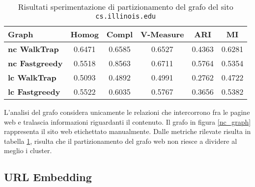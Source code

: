 \begin{table}[H]
	\begin{tabular}{| l | c | c | c | c | c |}
	\hline
	\textbf{Graph}  & \textbf{Homog} & \textbf{Compl} & \textbf{V-Measure}  & \textbf{ARI}  & \textbf{MI} \\ [3ex] \hline
	\textbf{nc WalkTrap} & 0.6471 & 0.6585 & 0.6527 & 0.4363 & 0.6281\\ [3ex]
	 \hline
	\textbf{nc Fastgreedy} & 0.5518 & 0.8563 & 0.6711 & 0.5764 & 0.5354\\ [3ex]
	 \hline	
	\textbf{lc WalkTrap} & 0.5093 & 0.4892 & 0.4991 & 0.2762 & 0.4722\\ [3ex]
	 \hline	
	\textbf{lc Fastgreedy} & 0.5522 & 0.6035 & 0.5767 & 0.3656 & 0.5382\\ [3ex]
	\hline
	\end{tabular}
	\caption{Risultati sperimentazione di partizionamento del grafo del sito \texttt{cs.illinois.edu}}
	\label{metricheGraph}
\end{table}

L'analisi del grafo considera unicamente le relazioni che intercorrono fra le pagine web e tralascia informazioni riguardanti il contenuto. Il grafo in figura \ref{nc_graph} rappresenta il sito web etichettato manualmente. Dalle metriche rilevate risulta in tabella \ref{metricheGraph}, risulta che il partizionamento del grafo web non riesce a dividere al meglio i cluster.


\subsection{URL Embedding}

